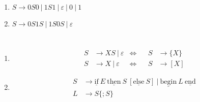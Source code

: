 \documentclass[a4paper,10pt]{scrartcl}
\begin{document}
\section{}
\begin{enumerate}
 \item $S \to 0S0\ |\ 1S1\ |\ \varepsilon\ |\ 0\ |\ 1$
 \item $S \to 0S1S\ |\ 1S0S\ |\ \varepsilon$
\end{enumerate}

\section{}
\begin{enumerate}
\item   \begin{align*}
            S &\to XS\ |\ \varepsilon & \Longleftrightarrow && S &\to \{X\} \\
            S &\to X\ |\ \varepsilon & \Longleftrightarrow && S &\to [X]
        \end{align*}
\item   \begin{align*}
            S &\to \underline{\textrm{if}}\ E\ \underline{\textrm{then}}\ S\ [\underline{\textrm{else}}\ S]\ |\ \underline{\textrm{begin}}\ L\ \underline{\textrm{end}} \\
            L &\to S\{; S\}
        \end{align*}
\end{enumerate}
\end{document}
